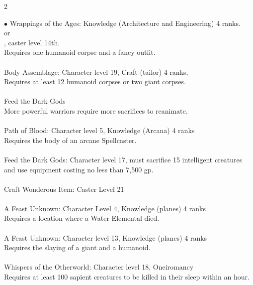 \begin{multicols}{2}
\begin{small}
\begin{list}{$\bullet$}{\itemspace}
Wrappings of the Ages: Knowledge (Architecture and Engineering) 4 ranks.\\
or\\
, caster level 14th.\\
Requires one humanoid corpse and a fancy outfit.\\
\\
Body Assemblage: Character level 19, Craft (tailor) 4 ranks,\\
Requires at least 12 humanoid corpses or two giant corpses.\\
\\
Feed the Dark Gods\\
More powerful warriors require more sacrifices to reanimate.\\
\\
Path of Blood: Character level 5, Knowledge (Arcana) 4 ranks\\
Requires the body of an arcane Spellcaster.\\
\\
Feed the Dark Gods: Character level 17, must sacrifice 15 intelligent creatures and use equipment costing no less than 7,500 gp.\\
\\
Craft Wonderous Item: Caster Level 21\\
\\
A Feast Unknown: Character Level 4, Knowledge (planes) 4 ranks\\
Requires a location where a Water Elemental died.\\
\\
A Feast Unknown: Character level 13, Knowledge (planes) 4 ranks\\
Requires the slaying of a giant and a humanoid.\\
\\
Whispers of the Otherworld: Character level 18, Oneiromancy\\
Requires at least 100 sapient creatures to be killed in their sleep within an hour.\\
\\

\end{list}
\end{small}
\end{multicols}
